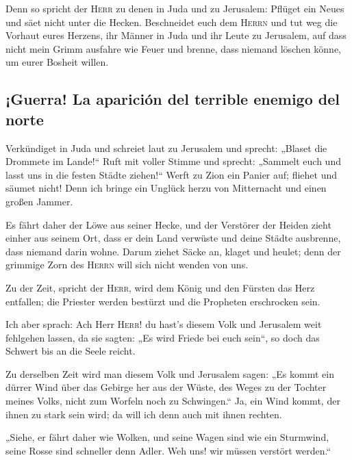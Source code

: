  Denn so spricht der \textsc{Herr} zu denen in Juda und zu
Jerusalem: Pflüget ein Neues und säet nicht unter die Hecken.
 Beschneidet euch dem \textsc{Herrn} und tut weg die
Vorhaut eures Herzens, ihr Männer in Juda und ihr Leute zu Jerusalem,
auf dass nicht mein Grimm ausfahre wie Feuer und brenne, dass niemand
löschen könne, um eurer Bosheit willen.

\hypertarget{guerra-la-apariciuxf3n-del-terrible-enemigo-del-norte}{%
\subsection{¡Guerra! La aparición del terrible enemigo del
norte}\label{guerra-la-apariciuxf3n-del-terrible-enemigo-del-norte}}

 Verkündiget in Juda und schreiet laut zu Jerusalem und
sprecht: „Blaset die Drommete im Lande!{}`` Ruft mit voller Stimme und
sprecht: „Sammelt euch und lasst uns in die festen Städte ziehen!{}``
 Werft zu Zion ein Panier auf; fliehet und säumet nicht!
Denn ich bringe ein Unglück herzu von Mitternacht und einen großen
Jammer.

 Es fährt daher der Löwe aus seiner Hecke, und der
Verstörer der Heiden zieht einher aus seinem Ort, dass er dein Land
verwüste und deine Städte ausbrenne, dass niemand darin wohne.
 Darum ziehet Säcke an, klaget und heulet; denn der
grimmige Zorn des \textsc{Herrn} will sich nicht wenden von uns.

 Zu der Zeit, spricht der \textsc{Herr}, wird dem König
und den Fürsten das Herz entfallen; die Priester werden bestürzt und die
Propheten erschrocken sein.

 Ich aber sprach: Ach Herr \textsc{Herr}! du hast's
diesem Volk und Jerusalem weit fehlgehen lassen, da sie sagten: „Es wird
Friede bei euch sein``, so doch das Schwert bis an die Seele reicht.

 Zu derselben Zeit wird man diesem Volk und Jerusalem
sagen: „Es kommt ein dürrer Wind über das Gebirge her aus der Wüste, des
Weges zu der Tochter meines Volks, nicht zum Worfeln noch zu
Schwingen.``  Ja, ein Wind kommt, der ihnen zu stark sein
wird; da will ich denn auch mit ihnen rechten.

 „Siehe, er fährt daher wie Wolken, und seine Wagen sind
wie ein Sturmwind, seine Rosse sind schneller denn Adler. Weh uns! wir
müssen verstört werden.``

